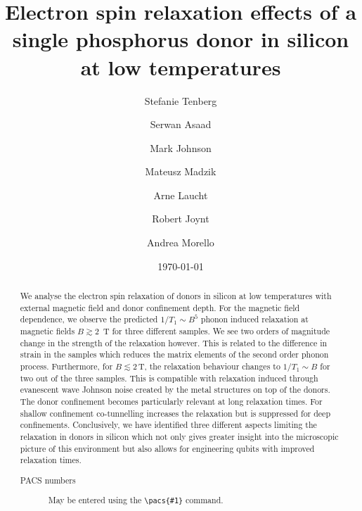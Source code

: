 \documentclass[%
 reprint,
 amsmath,amssymb,
 aps,
]{revtex4-1}
\begin{document}
\title{Electron spin relaxation effects of a single phosphorus donor in silicon at low temperatures}%

\author{Stefanie Tenberg}
 \author{Serwan Asaad}
 \author{Mark Johnson}
 \author{Mateusz Madzik}
\author{Arne Laucht}
\author{Robert Joynt}
\author{Andrea Morello}


\date{\today}

\begin{abstract}
We analyse the electron spin relaxation of donors in silicon at low temperatures with external magnetic field and donor confinement depth. For the magnetic field dependence, we observe the predicted $1/T_1\sim B^5$ phonon induced relaxation at magnetic fields $B\gtrsim 2\,$ T for three different samples. We see two orders of magnitude change in the strength of the relaxation however. This is related to the difference in strain in the samples which reduces the matrix elements of the second order phonon process.
Furthermore, for $B\lesssim 2\,$T, the relaxation behaviour changes to $1/T_1\sim B$ for two out of the three samples. This is compatible with relaxation induced through evanescent wave Johnson noise created by the metal structures on top of the donors. 
The donor confinement becomes particularly relevant at long relaxation times. For shallow confinement co-tunnelling increases the relaxation but is suppressed for deep confinements.
Conclusively, we have identified three different aspects limiting the relaxation in donors in silicon which not only gives greater insight into the microscopic picture of this environment but also allows for engineering qubits with improved relaxation times. 
\begin{description}

\item[PACS numbers]
May be entered using the \verb+\pacs{#1}+ command.

\end{description}
\end{abstract}
\end{document}
